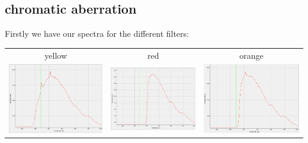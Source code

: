 \documentclass[12pt,a4paper]{article}
\begin{document}
\subsection{chromatic aberration}
Firstly we have our spectra for the different filters:\\
\begin{tabular}{c c c}
yellow & red & orange\\
\includegraphics[scale=.23]{yellow} & \includegraphics[scale=.23]{red} & \includegraphics[scale=.23]{orange}\\

\end{tabular}
\end{document}
